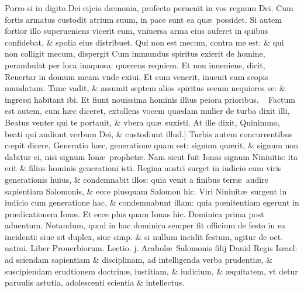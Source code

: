 \documentclass[a5paper,10pt]{book}
\def\leftmarginnote{%
	\lrmarginnote{\hskip -\marginparsep \hskip -6.5em}}
\def\rightmarginnote{%
	\lrmarginnote{\hskip\columnwidth \hskip -1em}}
\def\ae{æ}
\def\oe{œ}
\begin{document}
\begin{multicols*}{2}
Porro si in digito Dei eijcio d\ae monia, profecto peruenit in vos regnum Dei.
Cum fortis armatus custodit atrium suum, in pace sunt ea qu\ae \ possidet.
Si autem fortior illo superueniens vicerit eum, vniuersa arma eius auferet in quibus confidebat, \& spolia eius distribuet.
Qui non est mecum, contra me est: \& qui non colligit mecum, dispergit Cum immundus spiritus exierit de homine, perambulat per loca inaquosa: qu\ae rens requiem.
Et non inueniens, dicit, Reuertar in domum meam vnde exiui. Et cum venerit, inuenit eam scopis mundatam.
Tunc vadit, \& assumit septem alios spiritus secum nequiores se: \& ingressi habitant ibi.
Et fiunt nouissima hominis illius peiora\rightmarginnote{D} prioribus. \textdagger \ 
Factum est autem, cum h\ae c diceret, extollens vocem qu\ae dam mulier de turba dixit illi, Beatus venter qui te portauit, \& vbera qu\ae \ suxisti.
At ille dixit, Quinimmo, beati qui audiunt verbum Dei, \& custodiunt illud.]
Turbis\leftmarginnote{\begin{flushright}E\end{flushright}} autem concurrentibus c\oe pit dicere, Generatio h\ae c, generatione quam est: signum qu\ae rit, \& signum non dabitur ei, nisi signum Ion\ae \ prophet\ae .
Nam sicut fuit Ionas signum Niniuitis: ita erit \& filius hominis generationi isti.
Regina austri surget in iudicio cum viris generationis huius, \& condemnabit illos: quia venit a finibus terr\ae \ audire sapientiam Salomonis, \& ecce plusquam Salomon hic.
Viri Niniuit\ae \ surgent in iudicio cum generatione hac, \& condemnabunt illam: quia p\oe nitentiam egerunt in pr\ae dicationem Ion\ae . Et ecce plus quam Ionas hic.
\newline \textswab{C} \color{red} \hypertarget{SUN-PRIMA-POST-ADV}{Dominica prima post aduentum.}\color{black}
\bookmark[rellevel=-1,dest=SUN-PRIMA-POST-ADV]{DOMINICA I POST ADVENTVM}
\newline \color{red} Notandum, quod in hac dominica semper fit officium de festo in ea incidenti: siue sit duplex, siue simp. \& si nullum incidit festum, agitur de oct. natiui. \color{black}
\newline \textswab{C} \color{red} Liber Prouerbiorum. \hfill Lectio. j. \color{black}
\vspace{-1.25em}
Arabol\ae \ Salomonis\leftmarginnote{\begin{flushright}ca 1.\end{flushright}} filij Dauid Regis Israel: ad sciendam sapientiam \& disciplinam, ad intelligenda verba prudenti\ae , \& suscipiendam erudtionem doctrin\ae , iustitiam, \& iudicium, \& \ae quitatem, vt detur paruulis astutia, adolescenti scientia \& intellectus.

\end{multicols*}
\end{document}
